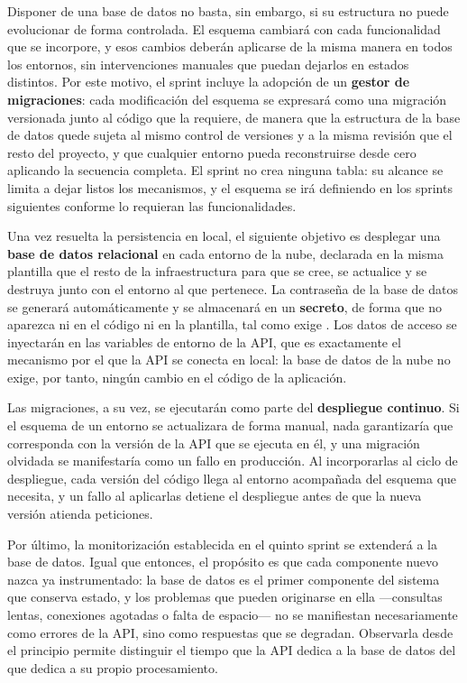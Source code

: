 Disponer de una base de datos no basta, sin embargo, si su estructura no puede
evolucionar de forma controlada. El esquema cambiará con cada funcionalidad
que se incorpore, y esos cambios deberán aplicarse de la misma manera en todos
los entornos, sin intervenciones manuales que puedan dejarlos en estados
distintos. Por este motivo, el sprint incluye la adopción de un \textbf{gestor
	de migraciones}: cada modificación del esquema se expresará como una migración
versionada junto al código que la requiere, de manera que la estructura de la
base de datos quede sujeta al mismo control de versiones y a la misma revisión
que el resto del proyecto, y que cualquier entorno pueda reconstruirse desde
cero aplicando la secuencia completa. El sprint no crea ninguna tabla: su
alcance se limita a dejar listos los mecanismos, y el esquema se irá definiendo
en los sprints siguientes conforme lo requieran las funcionalidades.

Una vez resuelta la persistencia en local, el siguiente objetivo es desplegar
una \textbf{base de datos relacional} en cada entorno de la nube, declarada en
la misma plantilla que el resto de la infraestructura para que se cree, se
actualice y se destruya junto con el entorno al que pertenece. La contraseña
de la base de datos se generará automáticamente y se almacenará en un
\textbf{secreto}, de forma que no aparezca ni en el código ni en la plantilla,
tal como exige . Los datos de acceso se inyectarán en las
variables de entorno de la API, que es exactamente el mecanismo por el que la
API se conecta en local: la base de datos de la nube no exige, por tanto,
ningún cambio en el código de la aplicación.

Las migraciones, a su vez, se ejecutarán como parte del \textbf{despliegue
	continuo}. Si el esquema de un entorno se actualizara de forma manual, nada
garantizaría que corresponda con la versión de la API que se ejecuta en él, y
una migración olvidada se manifestaría como un fallo en producción. Al
incorporarlas al ciclo de despliegue, cada versión del código llega al entorno
acompañada del esquema que necesita, y un fallo al aplicarlas detiene el
despliegue antes de que la nueva versión atienda peticiones.

Por último, la monitorización establecida en el quinto sprint se extenderá a
la base de datos. Igual que entonces, el propósito es que cada componente nuevo
nazca ya instrumentado: la base de datos es el primer componente del sistema
que conserva estado, y los problemas que pueden originarse en ella —consultas
lentas, conexiones agotadas o falta de espacio— no se manifiestan
necesariamente como errores de la API, sino como respuestas que se degradan.
Observarla desde el principio permite distinguir el tiempo que la API dedica a
la base de datos del que dedica a su propio procesamiento.

